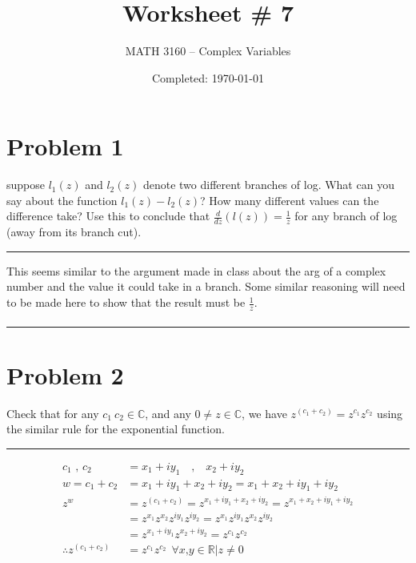 \documentclass{article}
\title{Worksheet \# 7}
\author{
  MATH 3160 -- Complex Variables\\
  \myauthor
}
\date{Completed: \today}
\newcommand{\der}[2]{\frac{d#1}{d#2}}
\begin{document}
\maketitle %


\section*{Problem 1}
suppose $l_1(z)$ and $l_2(z)$ denote two different branches of log. What can you say about the function $l_1(z)-l_2(z)$?
How many different values can the difference take? Use this to conclude that $\der{}{z} (l(z)) = \frac{1}{z}$ for any branch of log (away from its branch cut).
\vspace{.5cm}
\hrule %
\vspace{.5cm}

This seems similar to the argument made in class about the arg of a complex number and the value it could take in a branch. Some similar reasoning will need to be made here to show that the result must be $\frac{1}{z}$.
\begin{align*}
  
\end{align*}

\vspace{1cm}
\hrule %

\newpage
\section*{Problem 2}
Check that for any $c_1\ c_2 \in \mathbb{C}$, and any $ 0 \neq z \in \mathbb{C}$, we have $z^{(c_1+c_2)} = z^{c_1} z^{c_2}$ using the similar rule for the exponential function.
\vspace{.5cm} %
\hrule
\vspace{.5cm} %

\begin{align*}
  c_1\text{ , } c_2 &= x_1 + iy_1 \quad\text{,}\quad x_2 + iy_2 \\
  w = c_1+c_2 &= x_1 + iy_1 + x_2 + iy_2 = x_1 + x_2 + iy_1 + iy_2\\
  z^w &= z^{(c_1+c_2)} = z^{x_1 + iy_1 + x_2 + iy_2} = z^{x_1 + x_2 + iy_1 + iy_2}\\
                    &= z^{x_1}z^{ x_2 }z^{iy_1 }z^{ iy_2} = z^{x_1}z^{iy_1}z^{x_2}z^{iy_2} \\
                    &= z^{x_1+iy_1}z^{x_2+iy_2} = z^{c_1}z^{c_2}\\
                    \therefore z^{(c_1+c_2)} &= z^{c_1}z^{c_2}\ \   \forall x\text{,}y \in \mathbb{R} | z \neq 0 
\end{align*}
\end{document}
